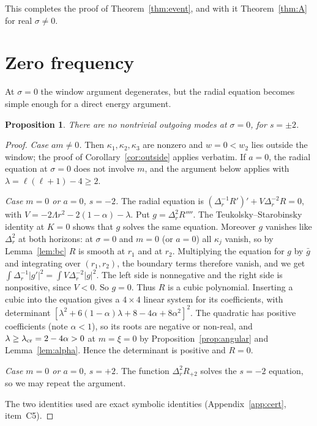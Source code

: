 \documentclass[11pt]{amsart}
\newtheorem{proposition}[theorem]{Proposition}
\theoremstyle{definition}
\theoremstyle{remark}
\numberwithin{equation}{section}
\begin{document}
This completes the proof of Theorem~\ref{thm:event}, and with it Theorem~\ref{thm:A} for real $\sigma\ne0$.

\section{Zero frequency}\label{sec:zero}
At $\sigma=0$ the window argument degenerates, but the radial equation becomes simple enough for a direct energy
argument.

\begin{proposition}\label{prop:zero}
There are no nontrivial outgoing modes at $\sigma=0$, for $s=\pm2$.
\end{proposition}
\begin{proof}
\emph{Case $am\ne0$.} Then $\kappa_1,\kappa_2,\kappa_3$ are nonzero and $w=0<w_2$ lies outside the window; the proof of
Corollary~\ref{cor:outside} applies verbatim. If $a=0$, the radial equation at $\sigma=0$ does not involve $m$, and the
argument below applies with $\lambda=\ell(\ell+1)-4\ge2$.

\emph{Case $m=0$ or $a=0$, $s=-2$.} The radial equation is $(\Delta_r^{-1}R')'+V\Delta_r^{-2}R=0$, with
$V=-2\Lambda r^2-2(1-\alpha)-\lambda$. Put $g=\Delta_r^2R''''$. The Teukolsky--Starobinsky identity at $K=0$ shows
that $g$ solves the same equation. Moreover $g$ vanishes like $\Delta_r^2$ at both horizons: at $\sigma=0$ and $m=0$ (or $a=0$) all $\kappa_j$ vanish, so by
Lemma~\ref{lem:bc} $R$ is smooth at $r_1$ and at $r_2$. Multiplying the equation for $g$ by $\bar g$ and integrating over $(r_1,r_2)$, the boundary terms therefore vanish,
and we get $\int\Delta_r^{-1}|g'|^2=\int V\Delta_r^{-2}|g|^2$. The left side is nonnegative and the right side is
nonpositive, since $V<0$. So $g=0$. Thus $R$ is a cubic polynomial. Inserting a cubic into the equation gives a $4\times4$ linear system for its
coefficients, with determinant $[\lambda^2+6(1-\alpha)\lambda+8-4\alpha+8\alpha^2]^2$. The quadratic has positive coefficients (note $\alpha<1$), so its roots are negative or non-real, and $\lambda\ge\lambda_{\rm cr}=2-4\alpha>0$ at $m=\xi=0$ by
Proposition~\ref{prop:angular} and Lemma~\ref{lem:alpha}. Hence the determinant is positive and $R=0$.

\emph{Case $m=0$ or $a=0$, $s=+2$.} The function $\Delta_r^2R_{+2}$ solves the $s=-2$ equation, so we may repeat the argument.

The two identities used are exact symbolic identities (Appendix~\ref{app:cert}, item~C5).
\end{proof}
\end{document}
